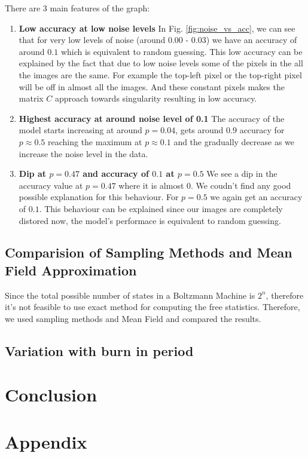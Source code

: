 \documentclass{article}
\begin{document}
There are 3 main features of the graph:
\begin{enumerate}

  \item \textbf {Low accuracy at low noise levels} \break
    In Fig. \ref{fig:noise_vs_acc}, we can see that for very low levels of noise 
    (around 0.00 - 0.03) we have an accuracy of around $ 0.1 $ which is 
    equivalent to random guessing. This low accuracy can be explained by the 
    fact that due to low noise levels some of the pixels in the all the images
    are the same. For example the top-left pixel or the top-right pixel will
    be off in almost all the images. And these constant pixels makes the matrix
    $ C $ approach towards singularity resulting in low accuracy.

  \item \textbf{Highest accuracy at around noise level of 0.1} \break
    The accuracy of the model starts increasing at around $ p=0.04 $, gets 
    around $ 0.9 $ accuracy for $ p \approx 0.5 $ reaching the maximum at 
    $ p \approx 0.1 $ and the gradually decrease as we increase the noise
    level in the data.

  \item \textbf{Dip at $ p=0.47 $ and accuracy of $ 0.1 $ at $ p=0.5 $} \break
    We see a dip in the accuracy value at $ p=0.47 $ where it is almost $ 0 $.
    We coudn't find any good possible explanation for this behaviour. For 
    $ p = 0.5 $ we again get an accuracy of $ 0.1 $. This behaviour can be 
    explained since our images are completely distored now, the model's 
    performace is equivalent to random guessing.

\end{enumerate}

\subsection*{Comparision of Sampling Methods and Mean Field Approximation}

Since the total possible number of states in a Boltzmann Machine is $ 2^n $, 
therefore it's not feasible to use exact method for computing the free 
statistics. Therefore, we used sampling methods and Mean Field and compared
the results.

\subsection*{Variation with burn in period}

\section*{Conclusion}

\section*{Appendix}
\end{document}
